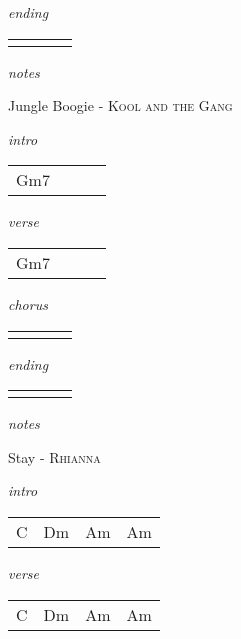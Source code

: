 \documentclass[12pt]{article}
\begin{document}
\textit{ending}

\begin{tabular}{|P{1.25in}|P{1.25in}|P{1.25in}|P{1.25in}|}
    &   &   &   \\
\end{tabular}

\textit{notes}

\newpage

{\Huge Jungle Boogie} {\huge - \textsc{Kool and the Gang}}

\huge
\textit{intro}

\begin{tabular}{|P{1.25in}|P{1.25in}|P{1.25in}|P{1.25in}|}
  Gm7 &   &   &   \\
\end{tabular}

\textit{verse}

\begin{tabular}{|P{1.25in}|P{1.25in}|P{1.25in}|P{1.25in}|}
  Gm7 &   &   &   \\
\end{tabular}

\textit{chorus}

\begin{tabular}{|P{1.25in}|P{1.25in}|P{1.25in}|P{1.25in}|}
    &   &   &   \\
\end{tabular}

\textit{ending}

\begin{tabular}{|P{1.25in}|P{1.25in}|P{1.25in}|P{1.25in}|}
    &   &   &   \\
\end{tabular}

\textit{notes}

\newpage

{\Huge Stay} {\huge - \textsc{Rhianna}}

\huge
\textit{intro}

\begin{tabular}{|P{1.25in}|P{1.25in}|P{1.25in}|P{1.25in}|}
  C & Dm  & Am  & Am  \\
\end{tabular}

\textit{verse}

\begin{tabular}{|P{1.25in}|P{1.25in}|P{1.25in}|P{1.25in}|}
  C & Dm  & Am  & Am  \\
\end{tabular}
\end{document}
